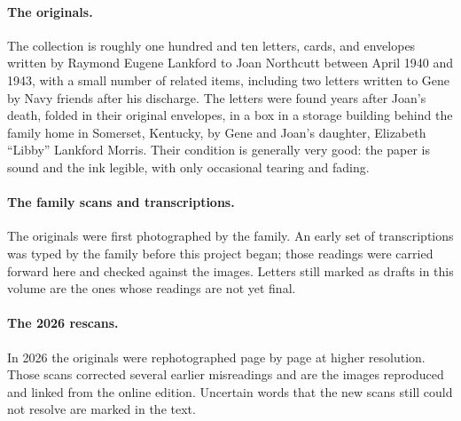 
\cleardoublepage
\thispagestyle{laplain}
\vspace*{0.10\textheight}
\begin{center}
    \par
    \vspace{0.4em}
    \brassrule[36pt]\par
\end{center}
\vspace{2em}

\paragraph{The originals.}
The collection is roughly one hundred and ten letters, cards, and envelopes
written by Raymond Eugene Lankford to Joan Northcutt between April 1940 and
1943, with a small number of related items, including two letters written to
Gene by Navy friends after his discharge. The letters were found years after
Joan's death, folded in their original envelopes, in a box in a storage
building behind the family home in Somerset, Kentucky, by Gene and Joan's
daughter, Elizabeth ``Libby'' Lankford Morris. Their condition is generally
very good: the paper is sound and the ink legible, with only occasional
tearing and fading.

\paragraph{The family scans and transcriptions.}
The originals were first photographed by the family. An early set of
transcriptions was typed by the family before this project began; those
readings were carried forward here and checked against the images. Letters
still marked as drafts in this volume are the ones whose readings are not yet
final.

\paragraph{The 2026 rescans.}
In 2026 the originals were rephotographed page by page at higher resolution.
Those scans corrected several earlier misreadings and are the images
reproduced and linked from the online edition. Uncertain words that the new
scans still could not resolve are marked in the text.

